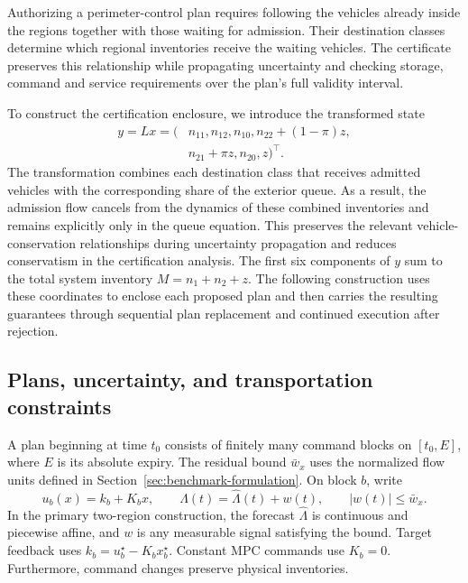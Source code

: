 \documentclass[preprint,12pt]{elsarticle}
\begin{document}
Authorizing a perimeter-control plan requires following the vehicles already
inside the regions together with those waiting for admission. Their
destination classes determine which regional inventories receive the waiting
vehicles. The certificate preserves this relationship while propagating
uncertainty and checking storage, command and service requirements over the
plan's full validity interval.

To construct the certification enclosure, we introduce the transformed state
\begin{equation}
\begin{aligned}
y=Lx=(&n_{11},n_{12},n_{10},n_{22}+(1-\pi)z,\\
      &n_{21}+\pi z,n_{20},z)^\top.
\end{aligned}
\label{eq:new-conservation-coordinates}
\end{equation}
The transformation combines each destination class that receives admitted
vehicles with the corresponding share of the exterior queue. As a result, the
admission flow cancels from the dynamics of these combined inventories and
remains explicitly only in the queue equation. This preserves the relevant
vehicle-conservation relationships during uncertainty propagation and reduces
conservatism in the certification analysis. The first six components of $y$
sum to the total system inventory $M=n_1+n_2+z$. The following construction
uses these coordinates to enclose each proposed plan and then carries the
resulting guarantees through sequential plan replacement and continued
execution after rejection.

\subsection{Plans, uncertainty, and transportation constraints}

A plan beginning at time $t_0$ consists of finitely many command blocks on
$[t_0,E]$, where $E$ is its absolute expiry. The residual bound $\bar w_x$ uses
the normalized flow units defined in Section~\ref{sec:benchmark-formulation}.
On block $b$, write
\begin{equation}
 u_b(x)=k_b+K_bx,
 \qquad \Lambda(t)=\widehat\Lambda(t)+w(t),
 \qquad |w(t)|\le\bar w_x.
 \label{eq:new-plan-data}
\end{equation}
In the primary two-region construction, the forecast $\widehat\Lambda$ is
continuous and piecewise affine, and $w$ is any measurable signal satisfying
the bound. Target feedback uses
$k_b=u_b^\star-K_bx_b^\star$. Constant MPC commands use $K_b=0$.
Furthermore, command changes preserve physical inventories.
\end{document}
